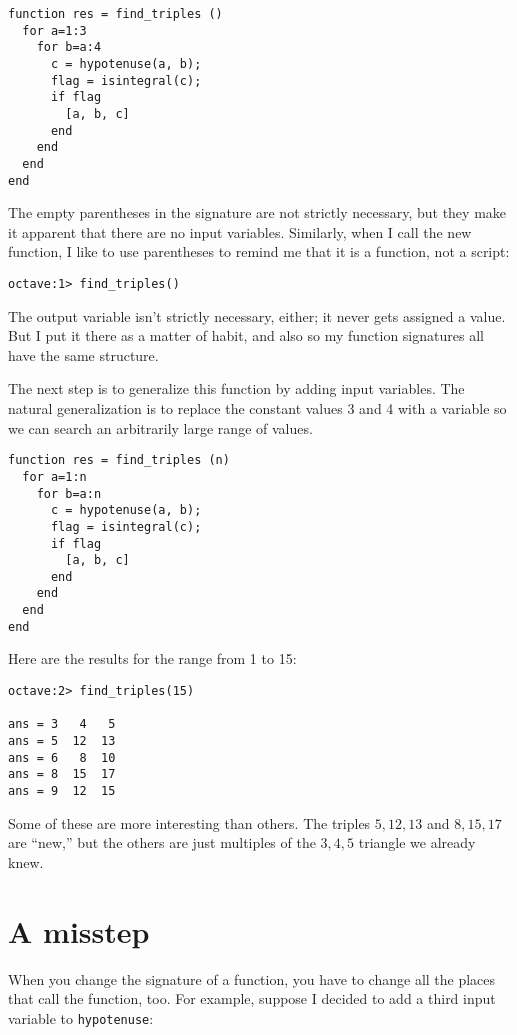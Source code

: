 \begin{verbatim}
function res = find_triples ()
  for a=1:3
    for b=a:4
      c = hypotenuse(a, b);
      flag = isintegral(c);
      if flag
        [a, b, c]
      end
    end
  end
end
\end{verbatim}

The empty parentheses in the signature are not strictly necessary, but
they make it apparent that there are no input variables. Similarly,
when I call the new function, I like to use parentheses to remind me
that it is a function, not a script:

\begin{verbatim}
octave:1> find_triples()
\end{verbatim}

The output variable isn't strictly necessary, either; it
never gets assigned a value. But I put it there as a matter of
habit, and also so my function signatures all have the same structure.

The next step is to generalize this function by adding input
variables. The natural generalization is to replace the constant
values 3 and 4 with a variable so we can search an arbitrarily large
range of values.

\begin{verbatim}
function res = find_triples (n)
  for a=1:n
    for b=a:n
      c = hypotenuse(a, b);
      flag = isintegral(c);
      if flag
        [a, b, c]
      end
    end
  end
end
\end{verbatim}

Here are the results for the range from 1 to 15:

\begin{verbatim}
octave:2> find_triples(15)

ans = 3   4   5
ans = 5  12  13
ans = 6   8  10
ans = 8  15  17
ans = 9  12  15
\end{verbatim}

Some of these are more interesting than others. The triples
$5,12,13$ and $8,15,17$ are ``new,'' but the others are just
multiples of the $3,4,5$ triangle we already knew.


\section{A misstep}

When you change the signature of a function, you have to change all
the places that call the function, too. For example, suppose
I decided to add a third input variable to {\tt hypotenuse}:

